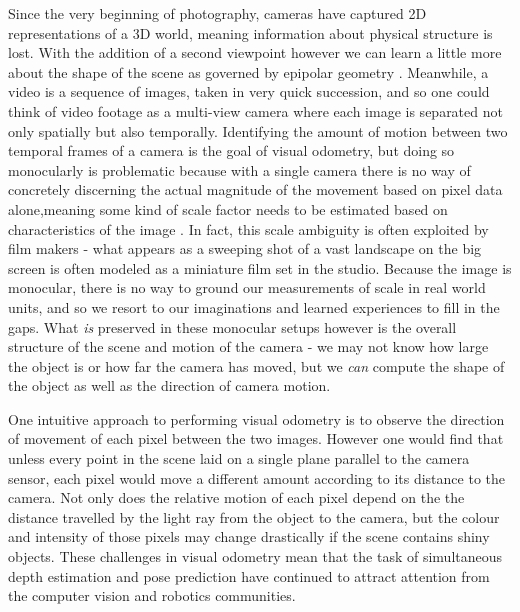 \documentclass[openany]{book}
\begin{document}
Since the very beginning of photography, cameras have captured 2D representations of a 3D world, meaning information about physical structure is lost. With the addition of a second viewpoint however we can learn a little more about the shape of the scene as governed by epipolar geometry \cite{zisserman2004multiview}. Meanwhile, a video is a sequence of images, taken in very quick succession, and so one could think of video footage as a multi-view camera where each image is separated not only spatially but also temporally. Identifying the amount of motion between two temporal frames of a camera is the goal of visual odometry, but doing so monocularly is problematic because with a single camera there is no way of concretely discerning the actual magnitude of the movement based on pixel data alone,meaning some kind of scale factor needs to be estimated based on characteristics of the image \cite{gakne2018scale, nister2004vo, zhou2016scale, zhou2019scale}. In fact, this scale ambiguity is often exploited by film makers - what appears as a sweeping shot of a vast landscape on the big screen is often modeled as a miniature film set in the studio. Because the image is monocular, there is no way to ground our measurements of scale in real world units, and so we resort to our imaginations and learned experiences to fill in the gaps. What \textit{is} preserved in these monocular setups however is the overall structure of the scene and motion of the camera - we may not know how large the object is or how far the camera has moved, but we \textit{can} compute the shape of the object as well as the direction of camera motion.

One intuitive approach to performing visual odometry is to observe the direction of movement of each pixel between the two images. However one would find that unless every point in the scene laid on a single plane parallel to the camera sensor, each pixel would move a different amount according to its distance to the camera. Not only does the relative motion of each pixel depend on the the distance travelled by the light ray from the object to the camera, but the colour and intensity of those pixels may change drastically if the scene contains shiny objects. These challenges in visual odometry mean that the task of simultaneous depth estimation and pose prediction have continued to attract attention from the computer vision and robotics communities.
\end{document}

